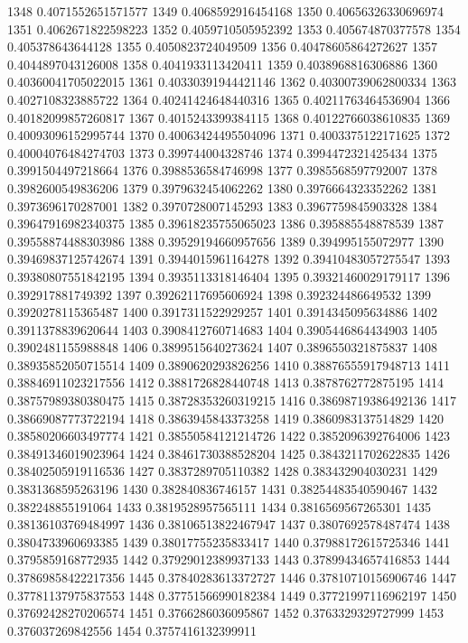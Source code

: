 1348 0.4071552651571577
1349 0.4068592916454168
1350 0.40656326330696974
1351 0.4062671822598223
1352 0.4059710505952392
1353 0.405674870377578
1354 0.405378643644128
1355 0.4050823724049509
1356 0.40478605864272627
1357 0.4044897043126008
1358 0.4041933113420411
1359 0.4038968816306886
1360 0.40360041705022015
1361 0.40330391944421146
1362 0.40300739062800334
1363 0.4027108323885722
1364 0.40241424648440316
1365 0.40211763464536904
1366 0.40182099857260817
1367 0.4015243399384115
1368 0.40122766038610835
1369 0.40093096152995744
1370 0.40063424495504096
1371 0.4003375122171625
1372 0.40004076484274703
1373 0.399744004328746
1374 0.3994472321425434
1375 0.3991504497218664
1376 0.3988536584746998
1377 0.3985568597792007
1378 0.3982600549836206
1379 0.3979632454062262
1380 0.3976664323352262
1381 0.3973696170287001
1382 0.3970728007145293
1383 0.3967759845903328
1384 0.39647916982340375
1385 0.39618235755065023
1386 0.395885548878539
1387 0.39558874488303986
1388 0.39529194660957656
1389 0.394995155072977
1390 0.39469837125742674
1391 0.3944015961164278
1392 0.39410483057275547
1393 0.39380807551842195
1394 0.3935113318146404
1395 0.39321460029179117
1396 0.392917881749392
1397 0.39262117695606924
1398 0.392324486649532
1399 0.3920278115365487
1400 0.3917311522929257
1401 0.3914345095634886
1402 0.3911378839620644
1403 0.3908412760714683
1404 0.3905446864434903
1405 0.3902481155988848
1406 0.3899515640273624
1407 0.3896550321875837
1408 0.38935852050715514
1409 0.3890620293826256
1410 0.38876555917948713
1411 0.38846911023217556
1412 0.3881726828440748
1413 0.3878762772875195
1414 0.38757989380380475
1415 0.38728353260319215
1416 0.38698719386492136
1417 0.38669087773722194
1418 0.3863945843373258
1419 0.3860983137514829
1420 0.38580206603497774
1421 0.38550584121214726
1422 0.3852096392764006
1423 0.38491346019023964
1424 0.38461730388528204
1425 0.3843211702622835
1426 0.38402505919116536
1427 0.3837289705110382
1428 0.383432904030231
1429 0.3831368595263196
1430 0.382840836746157
1431 0.38254483540590467
1432 0.382248855191064
1433 0.3819528957565111
1434 0.3816569567265301
1435 0.38136103769484997
1436 0.38106513822467947
1437 0.3807692578487474
1438 0.3804733960693385
1439 0.38017755235833417
1440 0.37988172615725346
1441 0.3795859168772935
1442 0.37929012389937133
1443 0.37899434657416853
1444 0.37869858422217356
1445 0.37840283613372727
1446 0.37810710156906746
1447 0.37781137975837553
1448 0.37751566990182384
1449 0.37721997116962197
1450 0.37692428270206574
1451 0.3766286036095867
1452 0.3763329329727999
1453 0.376037269842556
1454 0.3757416132399911
